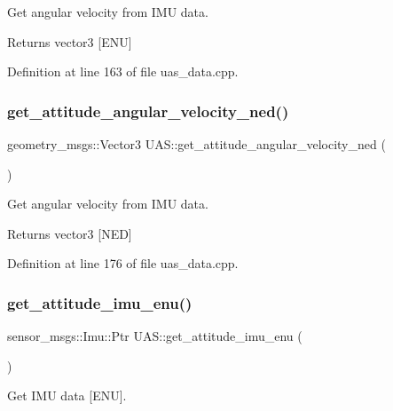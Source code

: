 Get angular velocity from I\+MU data. 

\begin{DoxyReturn}{Returns}
vector3 \mbox{[}E\+NU\mbox{]} 
\end{DoxyReturn}


Definition at line 163 of file uas\+\_\+data.\+cpp.

\mbox{\label{group__nodelib_gad8c9d0e754109b465ee25115ef55860e}} 
\subsubsection{\texorpdfstring{get\_attitude\_angular\_velocity\_ned()}{get\_attitude\_angular\_velocity\_ned()}}
{\footnotesize\ttfamily geometry\+\_\+msgs\+::\+Vector3 U\+A\+S\+::get\+\_\+attitude\+\_\+angular\+\_\+velocity\+\_\+ned (\begin{DoxyParamCaption}{ }\end{DoxyParamCaption})}



Get angular velocity from I\+MU data. 

\begin{DoxyReturn}{Returns}
vector3 \mbox{[}N\+ED\mbox{]} 
\end{DoxyReturn}


Definition at line 176 of file uas\+\_\+data.\+cpp.

\mbox{\label{group__nodelib_ga191709b6e50268022d10e469a3897975}} 
\subsubsection{\texorpdfstring{get\_attitude\_imu\_enu()}{get\_attitude\_imu\_enu()}}
{\footnotesize\ttfamily sensor\+\_\+msgs\+::\+Imu\+::\+Ptr U\+A\+S\+::get\+\_\+attitude\+\_\+imu\+\_\+enu (\begin{DoxyParamCaption}{ }\end{DoxyParamCaption})}



Get I\+MU data \mbox{[}E\+NU\mbox{]}. 




